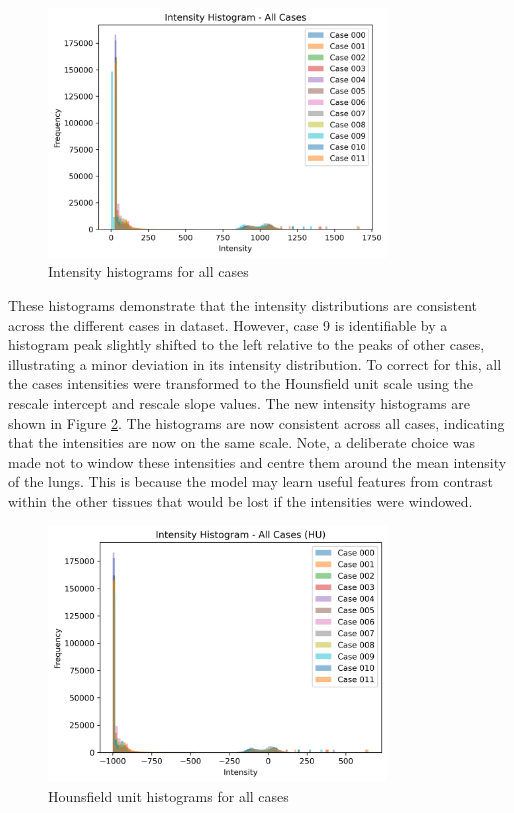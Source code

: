 \documentclass[11pt]{article}
\begin{document}
\begin{figure}[H]
    \centering
    \includegraphics[width=0.8\textwidth]{figs/intensity_histogram_orig.png}
    \caption{Intensity histograms for all cases}
    \label{fig:intensity_histograms}
\end{figure}

These histograms demonstrate that the intensity distributions are consistent across the different cases in dataset. However, case 9 is identifiable by a histogram peak slightly shifted to the left relative to the peaks of other cases, illustrating a minor deviation in its intensity distribution. To correct for this, all the cases intensities were transformed to the Hounsfield unit scale using the rescale intercept and rescale slope values. The new intensity histograms are shown in Figure \ref{fig:hounsfield_histograms_hu}. The histograms are now consistent across all cases, indicating that the intensities are now on the same scale. Note, a deliberate choice was made not to window these intensities and centre them around the mean intensity of the lungs. This is because the model may learn useful features from contrast within the other tissues that would be lost if the intensities were windowed.

\begin{figure}[H]
    \centering
    \includegraphics[width=0.8\textwidth]{figs/intensity_histogram_hu.png}
    \caption{Hounsfield unit histograms for all cases}
    \label{fig:hounsfield_histograms_hu}
\end{figure}
\end{document}
